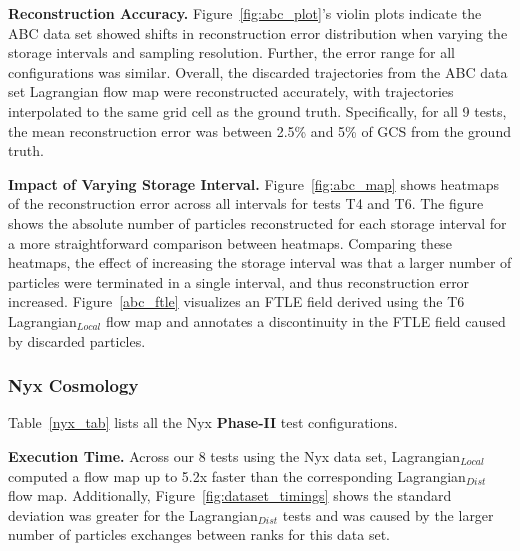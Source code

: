 \textbf{Reconstruction Accuracy.} Figure~\ref{fig:abc_plot}'s violin plots indicate the ABC data set showed shifts in reconstruction error distribution when varying the storage intervals and sampling resolution. 
%
Further, the error range for all configurations was similar.
%
Overall, the discarded trajectories from the ABC data set Lagrangian flow map were reconstructed accurately, with trajectories interpolated to the same grid cell as the ground truth.
%
Specifically, for all 9 tests, the mean reconstruction error was between 2.5\% and 5\% of GCS from the ground truth.
%

\textbf{Impact of Varying Storage Interval.} Figure~\ref{fig:abc_map} shows heatmaps of the reconstruction error across all intervals for tests T4 and T6.
%
The figure shows the absolute number of particles reconstructed for each storage interval for a more straightforward comparison between heatmaps.
%
Comparing these heatmaps, the effect of increasing the storage interval was that a larger number of particles were terminated in a single interval, and thus reconstruction error increased. 
%
%
Figure~\ref{abc_ftle} visualizes an FTLE field derived using the T6 Lagrangian$_{Local}$ flow map and annotates a discontinuity in the FTLE field caused by discarded particles.

\subsubsection{Nyx Cosmology}
\label{sec:nyx}
Table~\ref{nyx_tab} lists all the Nyx \textbf{Phase-II} test configurations. 
%


\textbf{Execution Time.} Across our 8 tests using the Nyx data set, Lagrangian$_{Local}$ computed a flow map up to 5.2x faster than the corresponding Lagrangian$_{Dist}$ flow map.
%
Additionally, Figure~\ref{fig:dataset_timings} shows the standard deviation was greater for the Lagrangian$_{Dist}$ tests and was caused by the larger number of particles exchanges between ranks for this data set.
%

